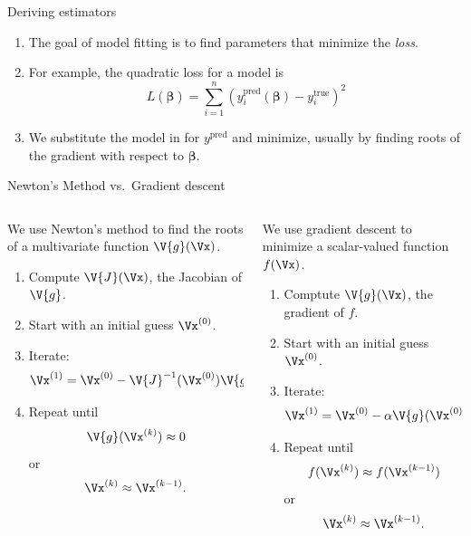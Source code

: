 \documentclass[9pt]{beamer}
\begin{document}
\begin{frame}{Deriving estimators}
\begin{enumerate}
	\item The goal of model fitting is to find parameters that minimize the \emph{loss}.
	\item For example, the quadratic loss for a model is
	\[ L(\boldsymbol{\beta}) = \sum_{i=1}^n\left( y_i^\text{pred}(\boldsymbol{\beta}) - y_i^\text{true} \right)^2 \]
	\pause
	\item We substitute the model in for $y^\text{pred}$ and minimize, usually by finding roots of the gradient with respect to $\boldsymbol{\beta}$. 
\end{enumerate}
\end{frame}

\begin{frame}{Newton's Method vs.\ Gradient descent}

\begin{columns}
\begin{column}{0.5\textwidth}
	We use Newton's method to find the roots of a multivariate function $\V{g}(\Vx)$.
	
	\begin{enumerate}
		\item Compute $\V{J}(\Vx)$, the Jacobian of $\V{g}$.
		\item Start with an initial guess $\Vx^{(0)}$.
		\item Iterate: \[ \Vx^{(1)} = \Vx^{(0)} - \V{J}^{-1}(\Vx^{(0)})\V{g}(\Vx^{(0)}). \]
		\item Repeat until \[ \V{g}(\Vx^{(k)}) \approx 0 \] or \[ \Vx^{(k)} \approx \Vx^{(k-1)}. \]
	\end{enumerate}
\end{column}
\begin{column}{0.5\textwidth}
	We use gradient descent to minimize a scalar-valued function $f(\Vx)$.
	
	\begin{enumerate}
		\item Comptute $\V{g}(\Vx)$, the gradient of $f$.
		\item Start with an initial guess $\Vx^{(0)}$.
		\item Iterate: \[ \Vx^{(1)} = \Vx^{(0)} - \alpha \V{g}(\Vx^{(0)}). \]
		\item Repeat until \[ f(\Vx^{(k)}) \approx f(\Vx^{(k-1)}) \] or \[ \Vx^{(k)} \approx \Vx^{(k-1)}. \]
	\end{enumerate}
\end{column}
\end{columns}

	
\end{frame}
\end{document}
